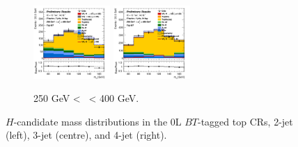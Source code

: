 \begin{figure}[h!]
\begin{subfigure}[b]{\textwidth}
        \includegraphics[width=0.32\textwidth]{Images/VH/Own_fit/postfit_VHcc/Region_distmBB_BMax400_BMin250_DtopCRBC_J3_TTypebt_T1_L0_Y6051_GlobalFit_conditionnal_mu1.png}
        \includegraphics[width=0.32\textwidth]{Images/VH/Own_fit/postfit_VHbb/Region_distmBB_BMax400_BMin250_DtopCRBC_J4_TTypebt_T1_L0_Y6051_GlobalFit_conditionnal_mu1.png} %
        \caption{250 GeV < \ptv\ < 400 GeV.}
        \label{fig:plots_VHcc_OL_250_TopCR_2c}
    \end{subfigure}
    \caption{$H$-candidate mass distributions in the 0L $BT$-tagged top CRs, 2-jet (left), 3-jet (centre), and 4-jet (right).}
    \label{fig:plots_VHcc_OL_TopCR_2c}
\end{figure} 

\vspace*{\fill} \newpage
\vspace*{\fill} 

